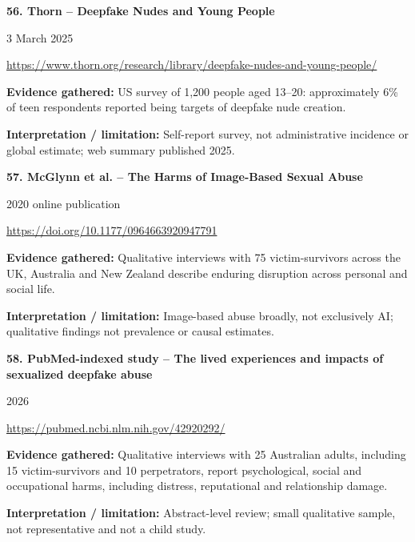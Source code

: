\documentclass[11pt,a4paper]{article}
\begin{document}
\noindent\begin{minipage}{\linewidth}\textbf{56. Thorn -- Deepfake Nudes and Young People}\par{\small 3 March 2025\par\url{https://www.thorn.org/research/library/deepfake-nudes-and-young-people/}}\par
\textbf{Evidence gathered:} US survey of 1,200 people aged 13--20: approximately 6\% of teen respondents reported being targets of deepfake nude creation.\par\textbf{Interpretation / limitation:} Self-report survey, not administrative incidence or global estimate; web summary published 2025.\par
\end{minipage}\par\vspace{2mm}
\noindent\begin{minipage}{\linewidth}\textbf{57. McGlynn et al. -- The Harms of Image-Based Sexual Abuse}\par{\small 2020 online publication\par\url{https://doi.org/10.1177/0964663920947791}}\par
\textbf{Evidence gathered:} Qualitative interviews with 75 victim-survivors across the UK, Australia and New Zealand describe enduring disruption across personal and social life.\par\textbf{Interpretation / limitation:} Image-based abuse broadly, not exclusively AI; qualitative findings not prevalence or causal estimates.\par
\end{minipage}\par\vspace{2mm}
\noindent\begin{minipage}{\linewidth}\textbf{58. PubMed-indexed study -- The lived experiences and impacts of sexualized deepfake abuse}\par{\small 2026\par\url{https://pubmed.ncbi.nlm.nih.gov/42920292/}}\par
\textbf{Evidence gathered:} Qualitative interviews with 25 Australian adults, including 15 victim-survivors and 10 perpetrators, report psychological, social and occupational harms, including distress, reputational and relationship damage.\par\textbf{Interpretation / limitation:} Abstract-level review; small qualitative sample, not representative and not a child study.\par
\end{minipage}\par\vspace{2mm}
\end{document}
